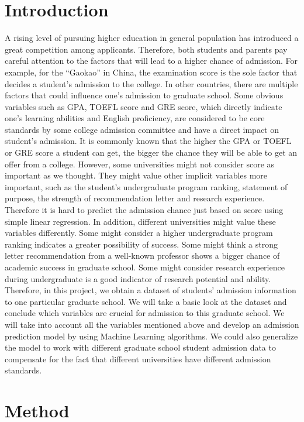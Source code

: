 \documentclass{article}
\begin{document}
\section{Introduction}
A rising level of pursuing higher education in general population has introduced a great competition among applicants. Therefore, both students and parents pay careful attention to the factors that will lead to a higher chance of admission. For example, for the “Gaokao” in China, the examination score is the sole factor that decides a student’s admission to the college. In other countries, there are multiple factors that could influence one’s admission to graduate school. Some obvious variables such as GPA, TOEFL score and GRE score, which directly indicate one’s learning abilities and English proficiency, are considered to be core standards by some college admission committee and have a direct impact on student’s admission. It is commonly known that the higher the GPA or TOEFL or GRE score a student can get, the bigger the chance they will be able to get an offer from a college. However, some universities might not consider score as important as we thought. They might value other implicit variables more important, such as the student’s undergraduate program ranking, statement of purpose, the strength of recommendation letter and research experience. Therefore it is hard to predict the admission chance just based on score using simple linear regression. In addition, different universities might value these variables differently. Some might consider a higher undergraduate program ranking indicates a greater possibility of success. Some might think a strong letter recommendation from a well-known professor shows a bigger chance of academic success in graduate school. Some might consider research experience during undergraduate is a good indicator of research potential and ability. Therefore, in this project, we obtain a dataset of students’ admission information to one particular graduate school. We will take a basic look at the dataset and conclude which variables are crucial for admission to this graduate school. We will take into account all the variables mentioned above and develop an admission prediction model by using Machine Learning algorithms. We could also generalize the model to work with different graduate school student admission data to compensate for the fact that different universities have different admission standards. 

\section{Method}
\end{document}
